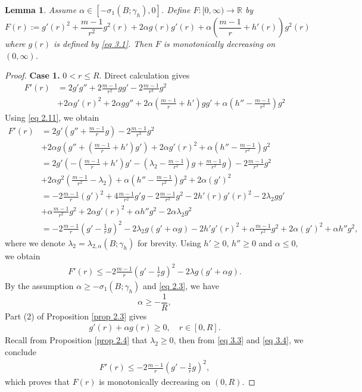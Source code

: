 \documentclass[11pt,leqno]{amsart}
\newtheorem{lemma}{Lemma}[section]
\def\a{\alpha}
\def\l{\lambda}
\numberwithin{equation}{section}
\begin{document}
\begin{lemma}\label{lm 3.1}
Assume  $\a \in [-\sigma_1(B; \gamma_h),0]$. Define $F:[0,\infty)\to\mathbb{R}$ by
\begin{equation}\label{defH}
F(r):=g'(r)^2+\frac {m-1} {r^2}g^2(r) +2\a g(r)g'(r)+\a(\frac{m-1}{r}+h'(r))g^2(r)
\end{equation}
where $g(r)$ is defined by \eqref{eq 3.1}.
Then $F$ is monotonically decreasing on $(0,\infty)$.
\end{lemma}
\begin{proof}
{\bf Case 1.} $0<r\le R$. Direct calculation gives
\begin{align*}
    F'(r)&=2g'g''+2\frac{m-1}{r^{2}}gg'-2\frac{m-1}{r^{3}}g^{2}\\
    &+2\alpha g'(r)^{2}+2\alpha g g''+2\alpha (\frac{m-1}{r}+h')gg'+\alpha(h''-\frac{m-1}{r^{2}})g^{2}
\end{align*}
Using  \eqref{eq 2.11}, we obtain
\begin{align*}
    F'(r)&=2g'(g''+\frac{m-1}{r}g)-2\frac{m-1}{r^{3}}g^{2}\\
    &+2\alpha g(g''+(\frac{m-1}{r}+h')g')+2\alpha g'(r)^{2}+\alpha (h''-\frac{m-1}{r^{2}})g^{2}\\
    &=2g'(-(\frac{m-1}{r}+h')g'-(\lambda_2 -\frac{m-1}{r^{2}})g+\frac{m-1}{r^{2}}g)-2\frac{m-1}{r^{3}}g^{2}\\
    &+2\alpha g^{2}(\frac{m-1}{r^{2}}-\lambda_2)+\alpha (h''-\frac{m-1}{r^{2}})g^{2}+2\alpha (g')^{2}\\
    &=-2\frac{m-1}{r}(g')^{2}+4\frac{m-1}{r^{2}}g'g-2\frac{m-1}{r^{3}}g^{2}-2h'(r)g'(r)^{2}-2\lambda_2 gg'\\
    &+\alpha \frac{m-1}{r^{2}}g^{2}+2\alpha g'(r)^{2}+\alpha h''g^{2}-2\alpha \lambda_2 g^{2}\\
    &=-2\frac{m-1}{r}(g'-\frac{1}{r}g)^{2}-2\lambda_2 g(g'+\alpha g)-2h'g'(r)^{2}+\alpha \frac{m-1}{r^{2}}g^{2}+2\alpha (g')^{2}+\alpha h''g^{2},
\end{align*}
where we denote $\l_2=\l_{2, \a}(B; \gamma_h)$  for brevity. 
Using  $h'\ge 0$, $h''\ge 0$ and $\a\le 0$, we obtain 
\begin{align}\label{eq 3.3}
   F'(r)\leq -2\frac{m-1}{r}(g'-\frac{1}{r}g)^{2}-2\lambda g(g'+\alpha g).
\end{align}
By the assumption $\a\ge -\sigma_1(B; \gamma_h)$ and \eqref{eq 2.3}, we have
$$
\a\ge -\frac 1 R,
$$
Part (2) of Proposition \ref{prop 2.3} gives 
\begin{align}\label{eq 3.4}
    g'(r)+\a g(r)\ge 0 , \quad r\in [0, R].
\end{align}
Recall from Proposition \ref{prop 2.4} that $\l_2\ge 0$, then  from \eqref{eq 3.3} and \eqref{eq 3.4}, we conclude
\begin{align*}
    F'(r)\leq -2\frac{m-1}{r}(g'-\frac{1}{r}g)^{2},
\end{align*}
which proves that $F(r)$ is monotonically decreasing on $(0, R)$.



\end{proof}
\end{document}
